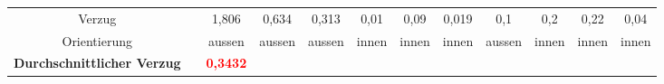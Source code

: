 \documentclass[12pt,a4paper,parskip]{scrartcl}
\begin{document}
\begin{table}
\begin{tabular}{cccccccccccc}
Verzug && 1,806 & 0,634 & 0,313 & 0,01 & 0,09 & 0,019 & 0,1 & 0,2 & 0,22 & 0,04 \\
Orientierung && aussen & aussen & aussen & innen & innen & innen & aussen & innen & innen & innen \\
\textbf{Durchschnittlicher Verzug} && \textbf{\textcolor{red}{0,3432}} &&&&&&&&&\\
\bottomrule

















\end{tabular}
\end{table}
\newpage
\end{document}

